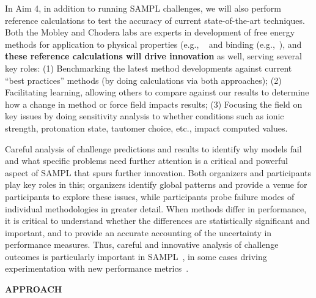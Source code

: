 \documentclass[11pt]{article}
\begin{document}
In Aim 4, in addition to running SAMPL challenges, we will also perform reference calculations to test the accuracy of current state-of-the-art techniques.
Both the Mobley and Chodera labs are experts in development of free energy methods for application to physical properties (e.g., ~\cite{mobley_blind_2014-1, Beauchamp:2015:JournalofPhysicalChemistryB, bannan_calculating_2016} and binding (e.g.,~\cite{rocklin_blind_2013, lim_sensitivity_2016, wang_identifying_2013}), and \textbf{these reference calculations will drive innovation} as well, serving several key roles: (1) Benchmarking the latest method developments against current ``best practices'' methods (by doing calculations via both approaches); (2) Facilitating learning, allowing others to compare against our results to determine how a change in method or force field impacts results; (3) Focusing the field on key issues by doing sensitivity analysis to whether conditions such as ionic strength, protonation state, tautomer choice, etc., impact computed values.

Careful analysis of challenge predictions and results to identify why models fail and what specific problems need further attention is a critical and powerful aspect of SAMPL that spurs further innovation.
Both organizers and participants play key roles in this; organizers identify global patterns and provide a venue for participants to explore these issues, while participants probe failure modes of individual methodologies in greater detail.
When methods differ in performance, it is critical to understand whether the differences are statistically significant and important, and to provide an accurate accounting of the uncertainty in performance measures. 
Thus, careful and innovative analysis of challenge outcomes is particularly important in SAMPL~\cite{mobley_blind_2014-1, bannan_blind_2016, yin_overview_2016}, in some cases driving experimentation with new performance metrics~\cite{mobley_blind_2014-1}.

{\large\textbf{APPROACH}}
\end{document}
